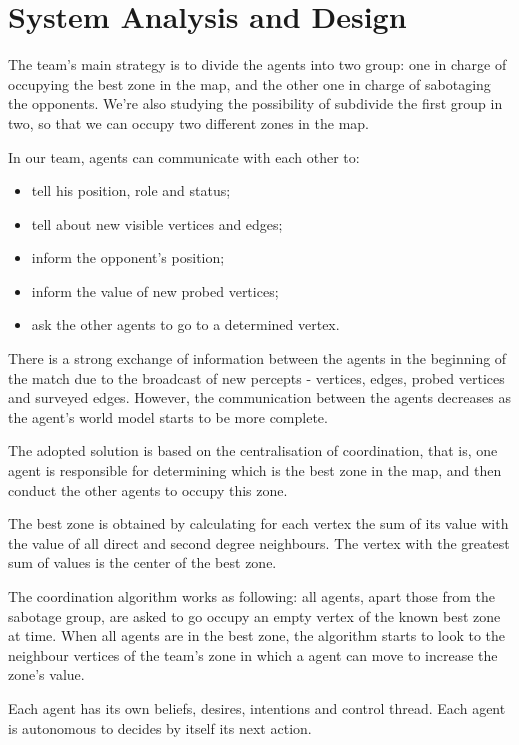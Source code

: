\documentclass{llncs}
\begin{document}
\section*{System Analysis and Design}

The team's main strategy is to divide the agents into two group: one in charge of
occupying the best zone in the map, and the other one in charge of sabotaging the
opponents. We're also studying the possibility of subdivide the first group in two,
so that we can occupy two different zones in the map.

In our team, agents can communicate with each other to:
\begin{itemize}
\item tell his position, role and status;
\item tell about new visible vertices and edges;
\item inform the opponent's position;
\item inform the value of new probed vertices;
\item ask the other agents to go to a determined vertex.
\end{itemize}
 
There is a strong exchange of information between the agents in the beginning of the
match due to the broadcast of new percepts - vertices, edges, probed vertices and surveyed edges.
However, the communication between the agents decreases as the agent's world model starts
to be more complete.

The adopted solution is based on the centralisation of coordination, that is, one agent
is responsible for determining which is the best zone in the map, and then conduct the
other agents to occupy this zone.

The best zone is obtained by calculating for each vertex the sum of its value with the value
of all direct and second degree neighbours. The vertex with the greatest sum of values is the
center of the best zone.

The coordination algorithm works as following: all agents, apart those from the sabotage group,
are asked to go occupy an empty vertex of the known best zone at time. When
all agents are in the best zone, the algorithm starts to look to the neighbour vertices of the
team's zone in which a agent can move to increase the zone's value.

Each agent has its own beliefs, desires, intentions and control thread. Each agent is autonomous
to decides by itself its next action.
\end{document}
